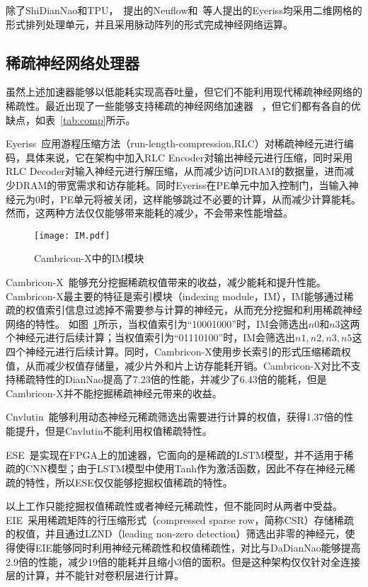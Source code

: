 除了ShiDianNao和TPU，~\citet{farabet2011neuflow}提出的Neuflow和~\citet{chen2016eyeriss}等人提出的Eyeriss均采用二维网格的形式排列处理单元，并且采用脉动阵列的形式完成神经网络运算。

\subsection{稀疏神经网络处理器}
虽然上述加速器能够以低能耗实现高吞吐量，但它们不能利用现代稀疏神经网络的稀疏性。最近出现了一些能够支持稀疏的神经网络加速器~\cite{chen2017eyeriss,zhang2016cambricon,albericio2016cnvlutin,han2016eie,han2017ese,angshuman2017scnn}
，但它们都有各自的优缺点，如表~\ref{tab:comp}所示。

Eyeriss~\cite{chen2017eyeriss}应用游程压缩方法（run-length-compression,RLC）对稀疏神经元进行编码，具体来说，它在架构中加入RLC Encoder对输出神经元进行压缩，同时采用RLC Decoder对输入神经元进行解压缩，从而减少访问DRAM的数据量，进而减少DRAM的带宽需求和访存能耗。同时Eyeriss在PE单元中加入控制门，当输入神经元为0时，PE单元将被关闭，这样能够跳过不必要的计算，从而减少计算能耗。然而，这两种方法仅仅能够带来能耗的减少，不会带来性能增益。

\begin{figure}[h]
  \centering
  \texttt{[image: IM.pdf]}
  \caption{\footnotesize Cambricon-X中的IM模块}
  \label{fig:IM}
\end{figure}

Cambricon-X~\cite{zhang2016cambricon}能够充分挖掘稀疏权值带来的收益，减少能耗和提升性能。
Cambricon-X最主要的特征是索引模块（indexing module，IM），IM能够通过稀疏的权值索引信息过滤掉不需要参与计算的神经元，从而充分挖掘和利用稀疏神经网络的特性。
如图~\ref{fig:IM}所示，当权值索引为“10001000”时，IM会筛选出$n0$和$n3$这两个神经元进行后续计算；当权值索引为“01110100”时，IM会筛选出$n1, n2, n3, n5$这四个神经元进行后续计算。同时，Cambricon-X使用步长索引的形式压缩稀疏权值，从而减少权值存储量，减少片外和片上访存能耗开销。Cambricon-X对比不支持稀疏特性的DianNao提高了7.23倍的性能，并减少了6.43倍的能耗，但是Cambricon-X并不能挖掘稀疏神经元带来的收益。

Cnvlutin~\cite{albericio2016cnvlutin}能够利用动态神经元稀疏筛选出需要进行计算的权值，获得1.37倍的性能提升，但是Cnvlutin不能利用权值稀疏特性。

ESE~\cite{han2017ese}是实现在FPGA上的加速器，它面向的是稀疏的LSTM模型，并不适用于稀疏的CNN模型；由于LSTM模型中使用Tanh作为激活函数，因此不存在神经元稀疏的特性，所以ESE仅仅能够挖掘权值稀疏的特性。

以上工作只能挖掘权值稀疏性或者神经元稀疏性，但不能同时从两者中受益。EIE~\cite{han2016eie}采用稀疏矩阵的行压缩形式（compressed sparse row，简称CSR）存储稀疏的权值，并且通过LZND（leading non-zero detection）筛选出非零的神经元，使得使得EIE能够同时利用神经元稀疏性和权值稀疏性，对比与DaDianNao能够提高2.9倍的性能，减少19倍的能耗并且缩小3倍的面积。但是这种架构仅仅针对全连接层的计算，并不能针对卷积层进行计算。

